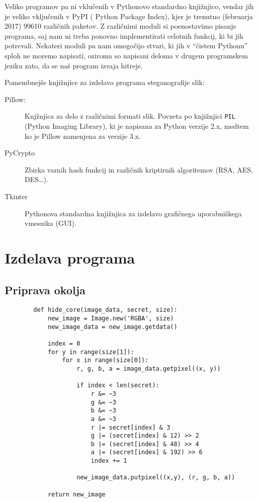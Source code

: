 \documentclass[a4paper, 12pt]{article}
\begin{document}
        Veliko programov pa ni vklučenih v Pythonovo standardno knjižnjico, vendar jih je veliko vključenih v PyPI ( Python Package Index), kjer je trenutno (februarja 2017) 99610 različnih paketov. Z različnimi moduli si poenostavimo pisanje programa, saj nam ni treba ponovno implementirati celotnih funkcij, ki bi jih potrevali. Nekateri moduli pa nam omogočijo stvari, ki jih v ``čistem Pythonu'' sploh ne moremo napisati, oziroma so napisani deloma v drugem programskem jeziku zato, da se naš program izvaja hitreje.

        Pomembnejše knjižnjice za izdelavo programa steganografije slik:
        \begin{description}
            \item [Pillow:] Knjžnjica za delo z različnimi formati slik. Povzeta po knjižnjici \texttt{PIL} (Python Imaging Library), ki je napisana za Python verzije 2.x, medtem ko je Pillow namenjena za verzije 3.x.  
            \item [PyCrypto] Zbirka varnih hash funkcij in različnih kriptirnih algoritemov (RSA, AES, DES\ldots).
            \item [Tkinter] Pythonova standardna knjižnjica za izdelavo grafičnega uporabniškega vmesnika (GUI).
        \end{description}


\section{Izdelava programa}
    
    \subsection{Priprava okolja}

    
    \begin{verbatim}
        def hide_core(image_data, secret, size):
            new_image = Image.new('RGBA', size)
            new_image_data = new_image.getdata()

            index = 0
            for y in range(size[1]):
                for x in range(size[0]):
                    r, g, b, a = image_data.getpixel((x, y))

                    if index < len(secret):
                        r &= ~3
                        g &= ~3
                        b &= ~3
                        a &= ~3
                        r |= secret[index] & 3
                        g |= (secret[index] & 12) >> 2
                        b |= (secret[index] & 48) >> 4
                        a |= (secret[index] & 192) >> 6
                        index += 1

                    new_image_data.putpixel((x,y), (r, g, b, a))

            return new_image
    \end{verbatim}
\end{document}
